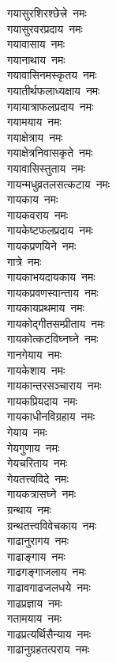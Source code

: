 \begin{multicols}{2}
\begin{flushleft}
गयासुरशिरश्छेत्त्रे~नमः\\
गयासुरवरप्रदाय~नमः\\
गयावासाय~नमः\\
गयानाथाय~नमः\hfill{}\\
गयावासिनमस्कृतय~नमः\\
गयातीर्थफलाध्यक्षाय~नमः\\
गयायात्राफलप्रदाय~नमः\\
गयामयाय~नमः\\
गयाक्षेत्राय~नमः\\
गयाक्षेत्रनिवासकृते~नमः\\
गयावासिस्तुताय~नमः\\
गायन्मधुव्रतलसत्कटाय~नमः\\
गायकाय~नमः\\
गायकवराय~नमः\hfill{}\\
गायकेष्टफलप्रदाय~नमः\\
गायकप्रणयिने~नमः\\
गात्रे~नमः\\
गायकाभयदायकाय~नमः\\
गायकप्रवणस्वान्ताय~नमः\\
गायकायप्रथमाय~नमः\\
गायकोद्गीतसम्प्रीताय~नमः\\
गायकोत्कटविघ्नघ्ने~नमः\\
गानगेयाय~नमः\\
गायकेशाय~नमः\hfill{}\\
गायकान्तरसञ्चाराय~नमः\\
गायकप्रियदाय~नमः\\
गायकाधीनविग्रहाय~नमः\\
गेयाय~नमः\\
गेयगुणाय~नमः\\
गेयचरिताय~नमः\\
गेयतत्त्वविदे~नमः\\
गायकत्रासघ्ने~नमः\\
ग्रन्थाय~नमः\\
ग्रन्थतत्त्वविवेचकाय~नमः\hfill{}\\
गाढानुरागय~नमः\\
गाढाङ्गाय~नमः\\
गाढगङ्गाजलाय~नमः\\
गाढावगाढजलधये~नमः\\
गाढप्रज्ञाय~नमः\\
गतामयाय~नमः\\
गाढप्रत्यर्थिसैन्याय~नमः\\
गाढानुग्रहतत्पराय~नमः\\

\end{flushleft}
\end{multicols}
